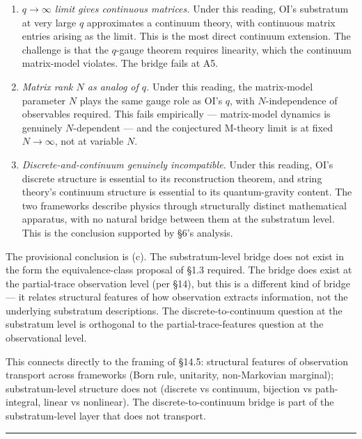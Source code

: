 \documentclass[
]{article}
\begin{document}
\begin{enumerate}
\def\labelenumi{(\alph{enumi})}
\item
  \emph{\(q \to \infty\) limit gives continuous matrices.} Under this
  reading, OI's substratum at very large \(q\) approximates a continuum
  theory, with continuous matrix entries arising as the limit. This is
  the most direct continuum extension. The challenge is that the
  \(q\)-gauge theorem requires linearity, which the continuum
  matrix-model violates. The bridge fails at A5.
\item
  \emph{Matrix rank \(N\) as analog of \(q\).} Under this reading, the
  matrix-model parameter \(N\) plays the same gauge role as OI's \(q\),
  with \(N\)-independence of observables required. This fails
  empirically --- matrix-model dynamics is genuinely \(N\)-dependent ---
  and the conjectured M-theory limit is at fixed \(N \to \infty\), not
  at variable \(N\).
\item
  \emph{Discrete-and-continuum genuinely incompatible.} Under this
  reading, OI's discrete structure is essential to its reconstruction
  theorem, and string theory's continuum structure is essential to its
  quantum-gravity content. The two frameworks describe physics through
  structurally distinct mathematical apparatus, with no natural bridge
  between them at the substratum level. This is the conclusion supported
  by §6's analysis.
\end{enumerate}

The provisional conclusion is (c). The substratum-level bridge does not
exist in the form the equivalence-class proposal of §1.3 required. The
bridge does exist at the partial-trace observation level (per §14), but
this is a different kind of bridge --- it relates structural features of
how observation extracts information, not the underlying substratum
descriptions. The discrete-to-continuum question at the substratum level
is orthogonal to the partial-trace-features question at the
observational level.

This connects directly to the framing of §14.5: structural features of
observation transport across frameworks (Born rule, unitarity,
non-Markovian marginal); substratum-level structure does not (discrete
vs continuum, bijection vs path-integral, linear vs nonlinear). The
discrete-to-continuum bridge is part of the substratum-level layer that
does not transport.

\begin{center}\rule{0.5\linewidth}{0.5pt}\end{center}
\end{document}
